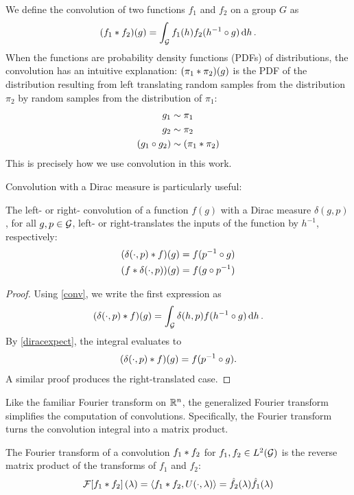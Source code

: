 \documentclass[../../main.tex]{subfiles}
\begin{document}
\begin{refsection}
	We define the convolution of two functions $f_1$ and $f_2$ on a group $G$ as
	\begin{equation} \label{conv}
		(f_1 * f_2)(g) = \int_{\mathcal{G}} f_1(h) f_2(h^{-1} \circ g) \dd{h}.
	\end{equation}
	When the functions are probability density functions (PDFs) of distributions, the convolution has an intuitive explanation:
	$(\pi_1 * \pi_2)(g)$ is the PDF of the distribution resulting from left translating random samples from the distribution $\pi_2$ by random samples from the distribution of $\pi_1$:
	\begin{align*}
		g_1             & \sim \pi_1                   \\
		g_2             & \sim \pi_2                   \\
		(g_1 \circ g_2) & \sim (\pi_1 * \pi_2)
	\end{align*}
	This is precisely how we use convolution in this work.

	Convolution with a Dirac measure is particularly useful:
	\begin{theorem} \label{diracconv}
		The left- or right- convolution of a function $f(g)$ with a Dirac measure $\delta(g, p)$, for all $g,p \in \mathcal{G}$, left- or right-translates the inputs of the function by $h^{-1}$, respectively:
		\begin{align*}
			(\delta(\cdot, p) * f)(g) & = f(p^{-1} \circ g) \\
			(f * \delta(\cdot, p))(g) & = f(g \circ p^{-1})
		\end{align*}
	\end{theorem}
	\begin{proof}
		Using \cref{conv}, we write the first expression as
		$$(\delta(\cdot, p) * f)(g) = \int_{\mathcal{G}} \delta(h, p) f(h^{-1} \circ g) \dd{h}.$$
		By \cref{diracexpect}, the integral evaluates to
		$$(\delta(\cdot, p) * f)(g) = f(p^{-1} \circ g).$$
		A similar proof produces the right-translated case.
	\end{proof}

	Like the familiar Fourier transform on $\mathbb{R}^n$, the generalized Fourier transform simplifies the computation of convolutions.
	Specifically, the Fourier transform turns the convolution integral into a matrix product.

	\begin{theorem}\label{convfourier}
		The Fourier transform of a convolution $f_1 * f_2$ for $f_1,f_2 \in L^2(\mathcal{G})$ is the reverse matrix product of the transforms of $f_1$ and $f_2$:
		$$\mathcal{F}\qty[f_1 * f_2](\lambda) = \left\langle f_1 * f_2, U(\cdot, \lambda) \right\rangle = \hat{f}_2(\lambda) \hat{f}_1(\lambda)$$
	\end{theorem}


\end{refsection}
\end{document}
